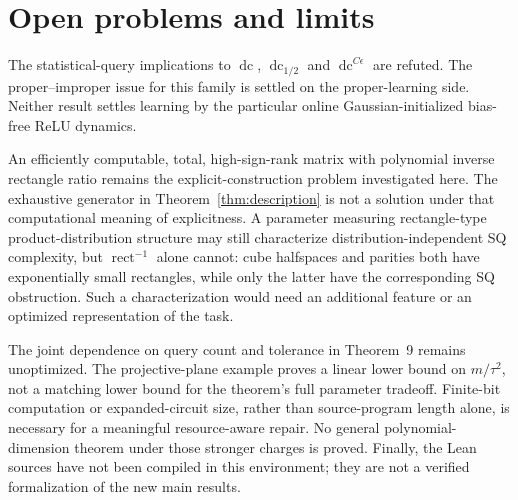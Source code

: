 \documentclass[11pt]{article}
\DeclareMathOperator{\dc}{dc}
\DeclareMathOperator{\rect}{rect}
\newcommand{\1}{\mathbf 1}
\begin{document}




\section{Open problems and limits}
The statistical-query implications to $\dc$, $\dc_{1/2}$ and $\dc^{C\epsilon}$ are refuted. The proper--improper issue for this family is settled on the proper-learning side. Neither result settles learning by the particular online Gaussian-initialized bias-free ReLU dynamics.

An efficiently computable, total, high-sign-rank matrix with polynomial inverse rectangle ratio remains the explicit-construction problem investigated here. The exhaustive generator in Theorem~\ref{thm:description} is not a solution under that computational meaning of explicitness. A parameter measuring rectangle-type product-distribution structure may still characterize distribution-independent SQ complexity, but $\rect^{-1}$ alone cannot: cube halfspaces and parities both have exponentially small rectangles, while only the latter have the corresponding SQ obstruction. Such a characterization would need an additional feature or an optimized representation of the task.

The joint dependence on query count and tolerance in Theorem~9 remains unoptimized. The projective-plane example proves a linear lower bound on $m/\tau^2$, not a matching lower bound for the theorem's full parameter tradeoff. Finite-bit computation or expanded-circuit size, rather than source-program length alone, is necessary for a meaningful resource-aware repair. No general polynomial-dimension theorem under those stronger charges is proved. Finally, the Lean sources have not been compiled in this environment; they are not a verified formalization of the new main results.

\appendix





\end{document}
